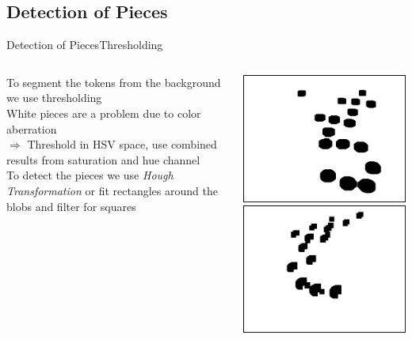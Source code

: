 \documentclass[table]{beamer}
\begin{document}
\subsection{Detection of Pieces}
\begin{frame}{Detection of Pieces}{Thresholding}
	\begin{columns}
		\begin{column}{0.6\textwidth}
			To segment the tokens from the background we use thresholding\\[0.5cm]

			White pieces are a problem due to color aberration\\
			$\Rightarrow$ Threshold in HSV space, use combined results from saturation and hue channel\\[0.5cm]

			To detect the pieces we use \emph{Hough Transformation} or fit rectangles around the blobs and filter for squares
		\end{column}
		\begin{column}{0.3\textwidth}
			\includegraphics[width=\columnwidth]{images/pieces_thresh_s.png}\\
			\includegraphics[width=\columnwidth]{images/pieces_thresh_v.png}
		\end{column}
	\end{columns}
\end{frame}
\end{document}
